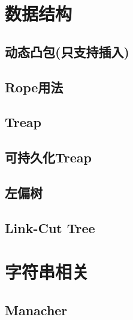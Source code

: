 \documentclass[landscape, twocolumn, 8pt, a4paper, twoside]{extarticle}
\begin{document}
\begin{spacing}{0.1}
\section{数据结构}
\subsection{动态凸包(只支持插入)}


\subsection{Rope用法}


\subsection{Treap}


\subsection{可持久化Treap}


\subsection{左偏树}


\subsection{Link-Cut Tree}


\section{字符串相关}
\subsection{Manacher}


%


\end{spacing}
\end{document}
